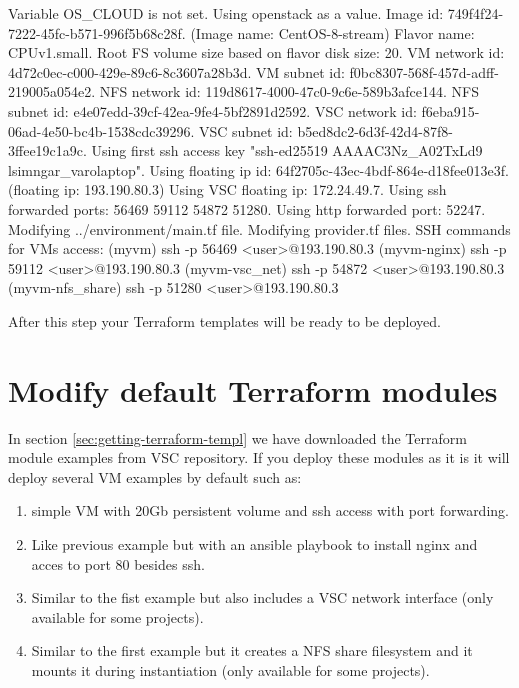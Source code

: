 \begin{prompt}
Variable OS_CLOUD is not set. Using openstack as a value.
Image id: 749f4f24-7222-45fc-b571-996f5b68c28f. (Image name: CentOS-8-stream)
Flavor name: CPUv1.small.
Root FS volume size based on flavor disk size: 20.
VM network id: 4d72c0ec-c000-429e-89c6-8c3607a28b3d.
VM subnet id: f0bc8307-568f-457d-adff-219005a054e2.
NFS network id: 119d8617-4000-47c0-9c6e-589b3afce144.
NFS subnet id: e4e07edd-39cf-42ea-9fe4-5bf2891d2592.
VSC network id: f6eba915-06ad-4e50-bc4b-1538cdc39296.
VSC subnet id: b5ed8dc2-6d3f-42d4-87f8-3ffee19c1a9c.
Using first ssh access key "ssh-ed25519 AAAAC3Nz_A02TxLd9 lsimngar_varolaptop".
Using floating ip id: 64f2705c-43ec-4bdf-864e-d18fee013e3f. (floating ip: 193.190.80.3)
Using VSC floating ip: 172.24.49.7.
Using ssh forwarded ports: 56469 59112 54872 51280.
Using http forwarded port: 52247.
Modifying ../environment/main.tf file.
Modifying provider.tf files.
SSH commands for VMs access:
(myvm)           ssh -p 56469 <user>@193.190.80.3
(myvm-nginx)     ssh -p 59112 <user>@193.190.80.3
(myvm-vsc_net)   ssh -p 54872 <user>@193.190.80.3
(myvm-nfs_share) ssh -p 51280 <user>@193.190.80.3
\end{prompt}

After this step your Terraform templates will be ready to be deployed.

\section{Modify default Terraform modules}\label{sec:modify-terraform-modules}
In section \ref{sec:getting-terraform-templ} we have downloaded the Terraform module examples from VSC repository.
If you deploy these modules as it is it will deploy several VM examples by default such as:


\begin{enumerate}
\item {} simple VM with 20Gb persistent volume and ssh access with port forwarding.
\item {} Like previous example but with an ansible playbook to install nginx and acces to port 80 besides ssh.
\item {} Similar to the fist example but also includes a VSC network interface (only available for some projects).
\item {} Similar to the first example but it creates a NFS share filesystem and it mounts it during instantiation (only available for some projects).
\end{enumerate}



